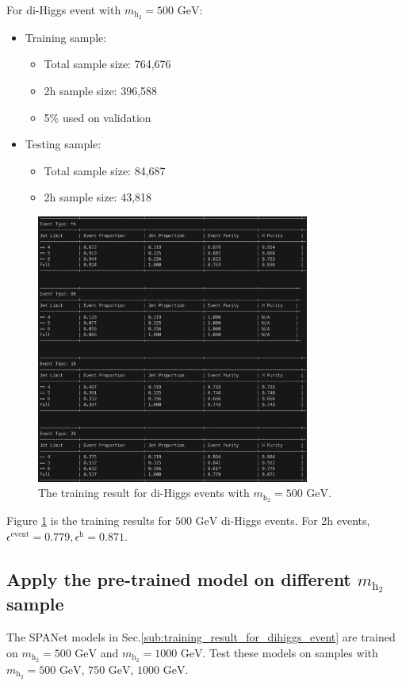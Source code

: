 \documentclass[12pt]{article}
\begin{document}
		For di-Higgs event with $m_{\text{h}_2} = \text{500 GeV}$:
		\begin{itemize}
			\item Training sample:
			\begin{itemize}
				\item Total sample size: 764,676
				\item 2h sample size: 396,588
				\item 5\% used on validation
			\end{itemize}
			\item Testing sample: 
				\begin{itemize}
					\item Total sample size: 84,687
					\item 2h sample size: 43,818
				\end{itemize}
		\end{itemize}
		\begin{figure}[htpb]
			\centering
			\includegraphics[width=0.8\textwidth]{1M_diHiggs_500_GeV.png}
			\caption{The training result for di-Higgs events with $m_{\text{h}_2} = \text{500 GeV}$.}
			\label{fig:1M_500_GeV_diHiggs_result}
		\end{figure}

		Figure \ref{fig:1M_500_GeV_diHiggs_result} is the training results for $\text{500 GeV}$ di-Higgs events. For 2h events, $\epsilon^{\text{event}} = 0.779, \epsilon^{\text{h}} = 0.871$.


	\subsection{Apply the pre-trained model on different \texorpdfstring{$m_{\text{h}_2}$}{mh2} sample}%
	\label{sub:apply_the_pre_trained_model_on_different_mh2_sample}
		The SPANet models in Sec.\ref{sub:training_result_for_dihiggs_event} are trained on $m_{\text{h}_2} = \text{500 GeV}$ and $m_{\text{h}_2} = \text{1000 GeV}$. Test these models on samples with $m_{\text{h}_2} = \text{500 GeV}$, $ \text{750 GeV}$, $\text{1000 GeV}$.
\end{document}
